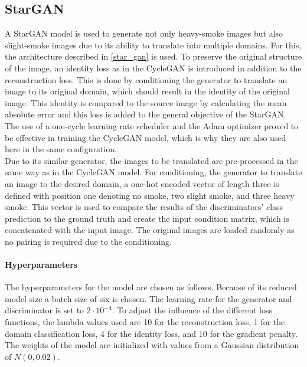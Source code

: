 \subsection{StarGAN}
A StarGAN model is used to generate not only heavy-smoke images but also slight-smoke images due to its ability to translate into multiple domains.
For this, the architecture described in \ref{star_gan} is used.
To preserve the original structure of the image, an identity loss as in the CycleGAN is introduced in addition to the reconstruction loss.
This is done by conditioning the generator to translate an image to its original domain, which should result in the identity of the original image.
This identity is compared to the source image by calculating the mean absolute error and this loss is added to the general objective of the StarGAN.
The use of a one-cycle learning rate scheduler and the Adam optimizer proved to be effective in training the CycleGAN model, which is why they are also used here in the same configuration.\\
Due to its similar generator, the images to be translated are pre-processed in the same way as in the CycleGAN model.
For conditioning, the generator to translate an image to the desired domain, a one-hot encoded vector of length three is defined with position one denoting no smoke, two slight smoke, and three heavy smoke.
This vector is used to compare the results of the discriminators' class prediction to the ground truth and create the input condition matrix, which is concatenated with the input image.
The original images are loaded randomly as no pairing is required due to the conditioning.
\paragraph{Hyperparameters} The hyperparameters for the model are chosen as follows.
Because of its reduced model size a batch size of six is chosen.
The learning rate for the generator and discriminator is set to $2 \cdot 10^{-4}$.
To adjust the influence of the different loss functions, the lambda values used are 10 for the reconstruction loss, 1 for the domain classification loss, 4 for the identity loss, and 10 for the gradient penalty.
The weights of the model are initialized with values from a Gaussian distribution of $N(0, 0.02)$.
